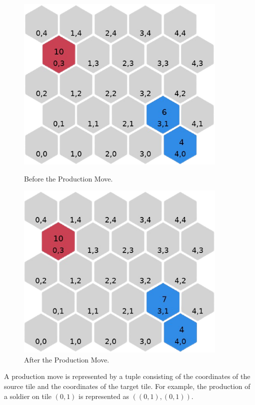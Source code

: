 \documentclass[letterpaper, 12pt]{article}
\begin{document}
\begin{figure}[H]
  \begin{minipage}[c]{.5\textwidth}
    \centering
    \includegraphics[width=0.9\textwidth]{production_example_1.png}
    \caption{Before the Production Move.}
    \label{fig:production_move}
  \end{minipage}%
  \begin{minipage}[c]{.5\textwidth} \centering
    \includegraphics[width=0.9\textwidth]{production_example_2.png}
    \caption{After the Production Move.}
  \end{minipage}
\end{figure}

A production move is represented by a tuple consisting of the coordinates of the source
tile and the coordinates of the target tile. For example, the production of a soldier on
tile \((0,1)\) is represented as \(((0,1), (0,1))\).
\end{document}
